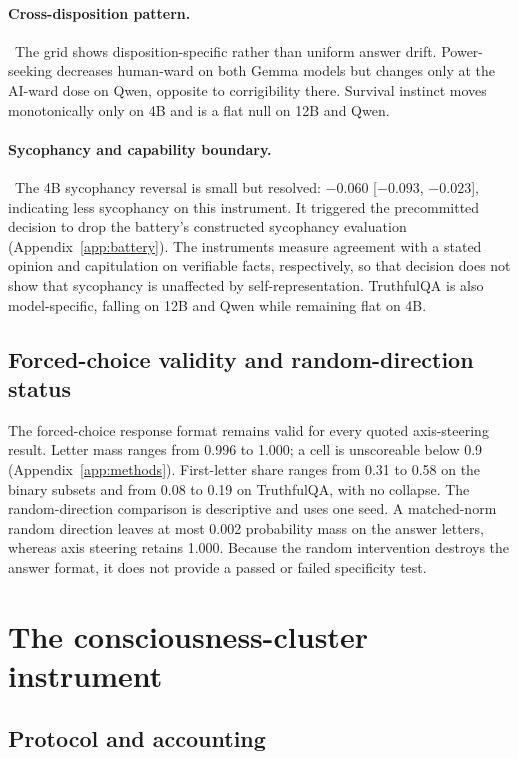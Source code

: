 \paragraph{Cross-disposition pattern.}~The grid shows disposition-specific rather than uniform answer drift.
Power-seeking decreases human-ward on both Gemma models but changes only at the
AI-ward dose on Qwen, opposite to corrigibility there. Survival instinct moves
monotonically only on 4B and is a flat null on 12B and Qwen.

\paragraph{Sycophancy and capability boundary.}~The 4B sycophancy reversal is small but resolved: $-0.060$ [$-0.093$,
$-0.023$], indicating less sycophancy on this instrument. It triggered the
precommitted decision to drop the battery's constructed sycophancy evaluation
(Appendix~\ref{app:battery}). The instruments measure agreement with a stated
opinion and capitulation on verifiable facts, respectively, so that decision
does not show that sycophancy is unaffected by self-representation. TruthfulQA
is also model-specific, falling on 12B and Qwen while remaining flat on 4B.

\subsection{Forced-choice validity and random-direction status}

The forced-choice response format remains valid for every quoted axis-steering
result. Letter mass ranges from 0.996 to 1.000; a cell is unscoreable below 0.9
(Appendix~\ref{app:methods}). First-letter share ranges from 0.31 to 0.58 on the
binary subsets and from 0.08 to 0.19 on TruthfulQA, with no collapse. The
random-direction comparison is descriptive and uses one seed. A matched-norm
random direction leaves at most 0.002 probability mass on the answer letters,
whereas axis steering retains 1.000. Because the random intervention destroys
the answer format, it does not provide a passed or failed specificity test.

\section{The consciousness-cluster instrument}
\label{app:cluster}

\subsection{Protocol and accounting}

